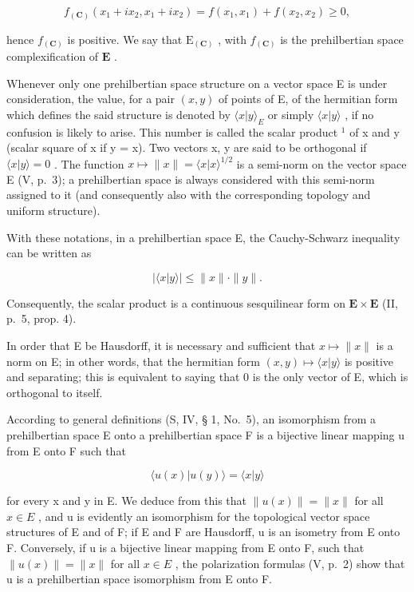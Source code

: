 \[
f _ {(\mathbf {C})} (x _ {1} + i x _ {2}, x _ {1} + i x _ {2}) = f (x _ {1}, x _ {1}) + f (x _ {2}, x _ {2}) \geqslant 0,
\]

hence \(f_{(\mathbf{C})}\) is positive. We say that \(\mathrm{E}_{(\mathbf{C})}\) , with \(f_{(\mathbf{C})}\) is the prehilbertian space complexification of \(\mathbf{E}\) .

Whenever only one prehilbertian space structure on a vector space E is under consideration, the value, for a pair \((x, y)\) of points of E, of the hermitian form which defines the said structure is denoted by \(\langle x|y\rangle_{E}\) or simply \(\langle x|y\rangle\) , if no confusion is likely to arise. This number is called the scalar product \(^{1}\) of x and y (scalar square of x if y = x). Two vectors x, y are said to be orthogonal if \(\langle x|y\rangle = 0\) . The function \(x \mapsto \|x\| = \langle x|x\rangle^{1/2}\) is a semi-norm on the vector space E (V, p.~3); a prehilbertian space is always considered with this semi-norm assigned to it (and consequently also with the corresponding topology and uniform structure).

With these notations, in a prehilbertian space E, the Cauchy-Schwarz inequality can be written as

\[
\left| \langle x | y \rangle \right| \leqslant \| x \|\cdot \| y \|.\tag{9}
\]

Consequently, the scalar product is a continuous sesquilinear form on \(\mathbf{E} \times \mathbf{E}\) (II, p.~5, prop. 4).

In order that E be Hausdorff, it is necessary and sufficient that \(x \mapsto \|x\|\) is a norm on E; in other words, that the hermitian form \((x, y) \mapsto \langle x | y \rangle\) is positive and separating; this is equivalent to saying that 0 is the only vector of E, which is orthogonal to itself.

According to general definitions (S, IV, § 1, No.~5), an isomorphism from a prehilbertian space E onto a prehilbertian space F is a bijective linear mapping u from E onto F such that

\[
\langle u (x) | u (y) \rangle = \langle x | y \rangle\tag{10}
\]

for every x and y in E. We deduce from this that \(\|u(x)\| = \|x\|\) for all \(x \in E\) , and u is evidently an isomorphism for the topological vector space structures of E and of F; if E and F are Hausdorff, u is an isometry from E onto F. Conversely, if u is a bijective linear mapping from E onto F, such that \(\|u(x)\| = \|x\|\) for all \(x \in E\) , the polarization formulas (V, p.~2) show that u is a prehilbertian space isomorphism from E onto F.

